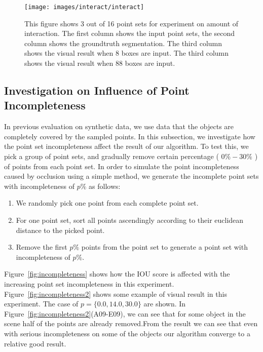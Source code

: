 \begin{figure}
	\centering
	\texttt{[image: images/interact/interact]}
	\caption{This figure shows 3 out of 16 point sets for experiment on amount of interaction. The first column shows the input point sets, the second column shows the groundtruth segmentation. The third column shows the visual result when 8 boxes are input. The third column shows the visual result when 88 boxes are input. }
	\label{fig:interact_vis}
\end{figure}

\subsection{Investigation on Influence of Point Incompleteness}
\label{sec:exp-incompleteness}
In previous evaluation on synthetic data, we use data that the objects are completely covered by the sampled points. 
%
In this subsection, we investigate how the point set incompleteness affect the result of our algorithm. 
%
To test this, we pick a group of point sets, and gradually remove certain percentage ( $0\%-30\%$ ) of points from each point set. In order to simulate the point incompleteness caused by occlusion using a simple method, we generate the incomplete point sets with incompleteness of $p\%$ as follows:
\begin{enumerate}
	\item We randomly pick one point from each complete point set. 
	\item For one point set, sort all points ascendingly according to their euclidean distance to the picked point.  
	\item Remove the first $p\%$ points from the point set to generate a point set with incompleteness of $p\%$.
\end{enumerate}
% 
Figure~\ref{fig:incompleteness} shows how the IOU score is affected with the increasing point set incompleteness in this experiment. 
Figure~\ref{fig:incompleteness2} shows some example of visual result in this experiment. The case of $p=\{0.0,14.0,30.0\}$ are shown. In Figure~\ref{fig:incompleteness2}(A09-E09), we can see that for some object in the scene half of the points are already removed.From the result we can see that even with serious incompleteness on some of the objects our algorithm converge to a relative good result.

